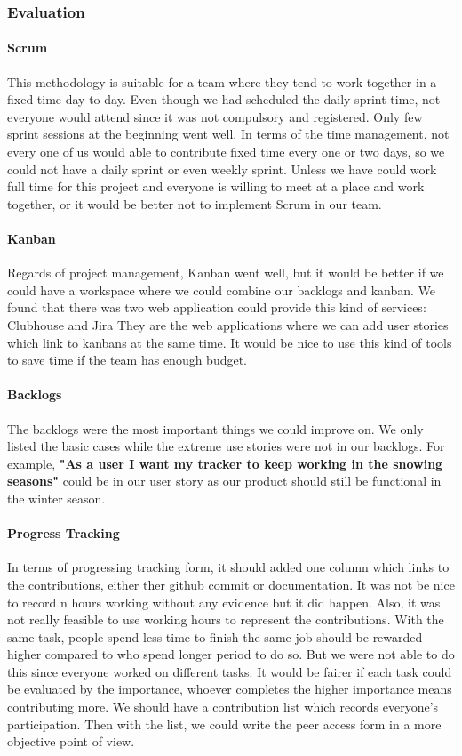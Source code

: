 \documentclass[12pt,a4paper]{article}
\begin{document}
      \subsubsection{Evaluation}

        \paragraph{Scrum} This methodology is suitable for a team where they tend to work together in a fixed time day-to-day. Even though we had scheduled the daily sprint time, not everyone would attend since it was not compulsory and registered. Only few sprint sessions at the beginning went well. In terms of the time management, not every one of us would able to contribute fixed time every one or two days, so we could not have a daily sprint or even weekly sprint. Unless we have could work full time for this project and everyone is willing to meet at a place and work together, or it would be better not to implement Scrum in our team. 
        
        \paragraph{Kanban} Regards of project management, Kanban went well, but it would be better if we could have a workspace where we could combine our backlogs and kanban. We found that there was two web application could provide this kind of services: Clubhouse and Jira They are the web applications where we can add user stories which link to kanbans at the same time. It would be nice to use this kind of tools to save time if the team has enough budget.
        
        \paragraph{Backlogs} The backlogs were the most important things we could improve on. We only listed the basic cases while the extreme use stories were not in our backlogs. For example, {\bf "As a user I want my tracker to keep working in the snowing seasons"} could be in our user story as our product should still be functional in the winter season.

        \paragraph{Progress Tracking} In terms of progressing tracking form, it should added one column which links to the contributions, either ther github commit or documentation. It was not be nice to record n hours working without any evidence but it did happen. Also, it was not really feasible to use working hours to represent the contributions. With the same task, people spend less time to finish the same job should be rewarded higher compared to who spend longer period to do so. But we were not able to do this since everyone worked on different tasks. It would be fairer if each task could be evaluated by the importance, whoever completes the higher importance means contributing more. We should have a contribution list which records everyone's participation. Then with the list, we could write the peer access form in a more objective point of view.
\end{document}

